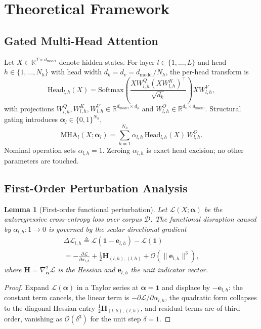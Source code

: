 \documentclass[11pt]{article}
\newtheorem{lemma}{Lemma}
\begin{document}
\section{Theoretical Framework}
\subsection{Gated Multi-Head Attention}
Let $X\in\mathbb{R}^{T\times d_{\text{model}}}$ denote hidden states. For layer
$l\in\{1,\dots,L\}$ and head $h\in\{1,\dots,N_h\}$ with head width
$d_k=d_v=d_{\text{model}}/N_h$, the per-head transform is
\begin{equation}
\mathrm{Head}_{l,h}(X)=\mathrm{Softmax}\!\left(\frac{XW^{Q}_{l,h}(XW^{K}_{l,h})^{\top}}{\sqrt{d_k}}\right)XW^{V}_{l,h},
\label{eq:head}
\end{equation}
with projections $W^{Q}_{l,h},W^{K}_{l,h},W^{V}_{l,h}\in\mathbb{R}^{d_{\text{model}}\times d_k}$
and $W^{O}_{l,h}\in\mathbb{R}^{d_v\times d_{\text{model}}}$. Structural gating
introduces $\boldsymbol{\alpha}_l\in\{0,1\}^{N_h}$,
\begin{equation}
\mathrm{MHA}_l(X;\boldsymbol{\alpha}_l)=\sum_{h=1}^{N_h}\alpha_{l,h}\,
\mathrm{Head}_{l,h}(X)\,W^{O}_{l,h}.
\label{eq:gated}
\end{equation}
Nominal operation sets $\alpha_{l,h}=1$. Zeroing $\alpha_{l,h}$ is exact head
excision; no other parameters are touched.

\subsection{First-Order Perturbation Analysis}
\begin{lemma}[First-order functional perturbation]
\label{lemma:1}
Let $\mathcal{L}(X;\boldsymbol{\alpha})$ be the autoregressive cross-entropy loss
over corpus $\mathcal{D}$. The functional disruption caused by
$\alpha_{l,h}\colon 1\to 0$ is governed by the scalar directional gradient
\begin{multline}\Delta\mathcal{L}_{l,h}\triangleq\mathcal{L}(\mathbf{1}-\mathbf{e}_{l,h})-\mathcal{L}(\mathbf{1})
\\=-\frac{\partial\mathcal{L}}{\partial\alpha_{l,h}}
+\tfrac{1}{2}\mathbf{H}_{(l,h),(l,h)}+\mathcal{O}(\|\mathbf{e}_{l,h}\|^{3}),\end{multline}
where $\mathbf{H}=\nabla_{\boldsymbol{\alpha}}^{2}\mathcal{L}$ is the Hessian and
$\mathbf{e}_{l,h}$ the unit indicator vector.
\end{lemma}
\begin{proof}
Expand $\mathcal{L}(\boldsymbol{\alpha})$ in a Taylor series at
$\boldsymbol{\alpha}=\mathbf{1}$ and displace by $-\mathbf{e}_{l,h}$: the constant
term cancels, the linear term is $-\partial\mathcal{L}/\partial\alpha_{l,h}$, the
quadratic form collapses to the diagonal Hessian entry
$\tfrac12\mathbf{H}_{(l,h),(l,h)}$, and residual terms are of third order,
vanishing as $\mathcal{O}(\delta^{3})$ for the unit step $\delta=1$.
\end{proof}
\end{document}
